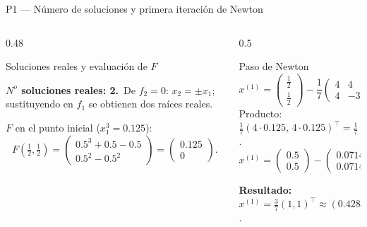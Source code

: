 \documentclass[aspectratio=169,10pt]{beamer}
\begin{document}
\begin{frame}{P1 — Número de soluciones y primera iteración de Newton}
\begin{columns}[T]
\begin{column}{0.48\textwidth}
\begin{cardgear}{Soluciones reales y evaluación de $F$}{\faCalculator}
{\footnotesize \textbf{$N^{\!o}$ soluciones reales: 2.}\ De $f_2=0$: $x_2=\pm x_1$; sustituyendo en $f_1$ se obtienen dos raíces reales.
\smallskip

$F$ en el punto inicial ($x_1^3=0.125$):
\[
F(\tfrac12,\tfrac12)=\begin{pmatrix}0.5^3+0.5-0.5\\ 0.5^2-0.5^2\end{pmatrix}=\begin{pmatrix}0.125\\ 0\end{pmatrix}.
\]}
\end{cardgear}
\end{column}
\begin{column}{0.5\textwidth}
\begin{cardgear}{Paso de Newton}{\faArrowRight}
{\footnotesize
\[
x^{(1)}=\begin{pmatrix}\tfrac12\\\tfrac12\end{pmatrix}-\frac17\begin{pmatrix}4&4\\4&-3\end{pmatrix}\begin{pmatrix}0.125\\0\end{pmatrix}.
\]
Producto: $\tfrac17(4\cdot0.125,\,4\cdot0.125)^{\!\top}=\tfrac17(0.5,0.5)^{\!\top}$.
\[
x^{(1)}=\begin{pmatrix}0.5\\0.5\end{pmatrix}-\begin{pmatrix}0.0714\\0.0714\end{pmatrix}=\tfrac37\begin{pmatrix}1\\1\end{pmatrix}.
\]}
\end{cardgear}
\vspace{1mm}
\begin{cardnota}[\faCheckCircle]
{\footnotesize \textbf{Resultado:}\ $x^{(1)}=\tfrac37(1,1)^{\!\top}\approx(0.4285,\,0.4285)^{\!\top}$.}
\end{cardnota}
\end{column}
\end{columns}
\end{frame}
\end{document}
